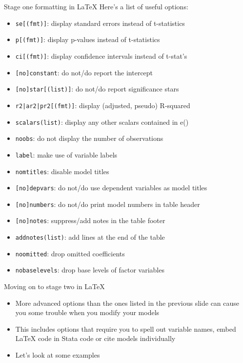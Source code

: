 \documentclass[aspectratio=169]{beamer}
\begin{document}
\begin{frame}[fragile]{Stage one formatting in \LaTeX }
Here's a list of useful options:
\begin{itemize}
\scriptsize
    \item   \texttt{se[(fmt)]}: display standard errors instead of t-statistics
    \item   \texttt{p[(fmt)]}: display p-values instead of t-statistics
    \item   \texttt{ci[(fmt)]}: display confidence intervals instead of t-stat's
    \item   \texttt{[no]constant}: do not/do report the intercept
    \item   \texttt{[no]star[(list)]}: do not/do report significance stars
    \item   \texttt{r2|ar2|pr2[(fmt)]}: display (adjusted, pseudo) R-squared
    \item   \texttt{scalars(list)}: display any other scalars contained in e()
    \item   \texttt{noobs}: do not display the number of observations
    \item   \texttt{label}: make use of variable labels
    \item   \texttt{nomtitles}: disable model titles
    \item   \texttt{[no]depvars}: do not/do use dependent variables as model titles
    \item   \texttt{[no]numbers}: do not/do print model numbers in table header
    \item   \texttt{[no]notes}: suppress/add notes in the table footer
    \item   \texttt{addnotes(list)}: add lines at the end of the table
    \item   \texttt{noomitted}: drop omitted coefficients
    \item   \texttt{nobaselevels}: drop base levels of factor variables
\end{itemize}
\end{frame}

\begin{frame}[fragile]{Moving on to stage two in \LaTeX }

\begin{itemize}
    \item More advanced options than the ones listed in the previous slide can cause you some trouble when you modify your models
    \item This includes options that require you to spell out variable names, embed {\LaTeX} code in Stata code or cite models individually
    \item Let's look at some examples
\end{itemize}
\end{frame}
\end{document}
